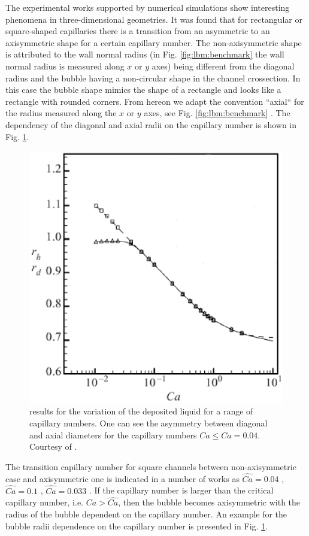 \documentclass{article}
\begin{document}
The experimental works
\cite{shikazono-square,cerro-bubble-train} supported by numerical simulations \cite{heil-threedim,
wang-non-circular} show interesting phenomena in three-dimensional geometries. It was found
\cite{heil-threedim,wong-films} that for rectangular
or square-shaped capillaries there is a transition from an asymmetric to an axisymmetric shape for a
certain capillary number.
The non-axisymmetric shape is attributed to the wall normal radius (in Fig.
\ref{fig:lbm:benchmark} the wall normal radius is measured along $x$ or $y$ axes) being 
different from the
diagonal radius and the bubble having a non-circular shape in the channel crossection. In this case
the bubble shape mimics the shape of a rectangle and looks like a rectangle with rounded corners.
From hereon we adapt the convention ``axial`` for the radius measured along the $x$ or $y$ axes,
see Fig. \ref{fig:lbm:benchmark} \cite{heil-threedim}. The dependency
of the diagonal and axial radii on the capillary number is shown in Fig. 
\ref{fig:heil:three:dim}.
\begin{figure}[ht]
\includegraphics[width=\textwidth]{Figures/capillary_width_heil.eps}
\caption{\citet{heil-threedim} results for the variation of the deposited liquid for a range of
capillary numbers. One can see the asymmetry between diagonal and axial diameters for the capillary
numbers $Ca\leq\hat{Ca}=0.04$. Courtesy of \citet{heil-threedim}. \label{fig:heil:three:dim}}
\end{figure}
The transition capillary number for square channels between non-axisymmetric case and axisymmetric
one is indicated in a number of
works as $\widehat{Ca}=0.04$ \cite{cerro-bubble-train},
$\widehat{Ca}=0.1$
\cite{cerro-space,wang-non-circular}, $\widehat{Ca}=0.033$ \cite{heil-threedim}. If the capillary
number is larger
than
the critical capillary number, i.e. $Ca>\widehat{Ca}$, then the bubble becomes axisymmetric with the
radius of the bubble dependent on the capillary number. An example for the bubble radii
dependence on the capillary number is presented in Fig. \ref{fig:heil:three:dim}.
\end{document}
